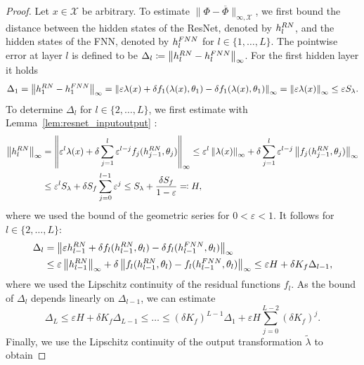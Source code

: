 \documentclass[10pt,a4paper]{amsart}
\newcommand{\eps}{\varepsilon}
\newcommand\norm[1]{\left\lVert#1\right\rVert}
\newcommand\normk[1]{\lVert#1\lVert}
\begin{document}
\begin{proof}
	Let $x\in \mathcal{X}$ be arbitrary. To estimate $\normk{\Phi-\overline{\Phi}}_{\infty,\mathcal{X}}$, we first bound the distance between the hidden states of the ResNet, denoted by $h_l^{\textup{RN}}$, and the hidden states of the FNN, denoted by $h_l^{\textup{FNN}}$ for $l \in \{1,\ldots,L\}$. The pointwise error at layer $l$ is defined to be $\Delta_l \coloneqq \norm{h_l^{\textup{RN}}-h_l^{\textup{FNN}}}_\infty$. 
    For the first hidden layer it holds 
    \begin{equation*}
        \Delta_1 = \norm{h_1^{\textup{RN}}-h_1^{\textup{FNN}}}_\infty = \norm{\eps \lambda(x) + \delta f_1(\lambda(x),\theta_1) -\delta f_1(\lambda(x),\theta_1)}_\infty = \norm{\eps \lambda(x)}_\infty \leq \eps S_\lambda.
    \end{equation*}
    To determine $\Delta_l$ for $l \in \{2, \ldots, L\}$, we first estimate with Lemma~\ref{lem:resnet_inputoutput} :
    \begin{align*}
        \norm{h_l^{\textup{RN}}}_\infty &= \norm{\eps^l \lambda(x) + \delta \sum_{j = 1}^{l} \eps^{l-j}f_j(h_{j-1}^{\textup{RN}},\theta_j)}_\infty \leq \eps^l \norm{\lambda(x)}_\infty + \delta \sum_{j=1}^{l} \eps^{l-j} \norm{f_j(h_{j-1}^{\textup{RN}},\theta_j)}_\infty \\
        &\leq \eps^l S_\lambda  + \delta S_f  \sum_{j=0}^{l-1} \eps^j 
        \leq S_\lambda  + \frac{\delta S_f}{1-\eps} \eqqcolon H,
    \end{align*}
    where we used the bound of the geometric series for $0 < \eps < 1$. It follows for $l \in \{2,\ldots,L\}$:
    \begin{align*}
        \Delta_l &= \norm{\eps h_{l-1}^{\textup{RN}} + \delta f_l(h_{l-1}^{\textup{RN}}, \theta_l) - \delta f_l(h_{l-1}^{\textup{FNN}}, \theta_l)}_\infty \\
        &\leq \eps \norm{h_{l-1}^{\textup{RN}}}_\infty + \delta \norm{f_l(h_{l-1}^{\textup{RN}}, \theta_l) - f_l(h_{l-1}^{\textup{FNN}}, \theta_l)}_\infty \leq \eps H + \delta K_f \Delta_{l-1},
    \end{align*}
    where we used the Lipschitz continuity of the residual functions $f_l$. As the bound of $\Delta_l$ depends linearly on $\Delta_{l-1}$, we can estimate
    \begin{equation*}
        \Delta_L \leq \eps H + \delta K_f \Delta_{L-1} \leq \ldots \leq (\delta K_f)^{L-1}\Delta_1 + \eps H \sum_{j = 0}^{L-2} (\delta K_f)^j.
    \end{equation*}
    Finally, we use the Lipschitz continuity of the output transformation $\tilde{\lambda}$ to obtain

\end{proof}
\end{document}
